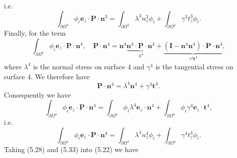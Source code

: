 \documentclass{article}
\begin{document}
i.e.
\begin{equation}
\int_{\partial \Omega^{3}} \phi_i \mathbf{e}_z \cdot \mathbf{P} \cdot \mathbf{n}^3 = \int_{\partial \Omega^{3}} \lambda^3 n_z^3 \phi_i + \int_{\partial \Omega^{3}} \gamma^3 t_z^3 \phi_i. \tag{5.33}
\end{equation}
Finally, for the term
\begin{equation}
\int_{\partial \Omega^{4}} \phi_i \mathbf{e}_z \cdot \mathbf{P} \cdot \mathbf{n}^4, \quad
\mathbf{P} \cdot \mathbf{n}^4 = \mathbf{n}^4 \underbrace{\mathbf{n}^4 \cdot \mathbf{P} \cdot \mathbf{n}^4}_{\lambda^4} + \underbrace{(\mathbf{I} - \mathbf{n}^4 \mathbf{n}^4) \cdot \mathbf{P} \cdot \mathbf{n}^4}_{\gamma^4 \mathbf{t}^4}, \tag{5.35}
\end{equation}
where $\lambda^4$ is the normal stress on surface 4 and $\gamma^4$ is the tangential stress on surface 4. We therefore have
\begin{equation}
\mathbf{P} \cdot \mathbf{n}^4 = \lambda^4 \mathbf{n}^4 + \gamma^4 \mathbf{t}^4. \tag{5.36}
\end{equation}
Consequently we have
\begin{equation}
\int_{\partial \Omega^{4}} \phi_i \mathbf{e}_z \cdot \mathbf{P} \cdot \mathbf{n}^4 = \int_{\partial \Omega^{4}} \phi_i \lambda^4 \mathbf{e}_z \cdot \mathbf{n}^4 + \int_{\partial \Omega^{4}} \phi_i \gamma^4 \mathbf{e}_z \cdot \mathbf{t}^4, \tag{5.37}
\end{equation}
i.e.
\begin{equation}
\int_{\partial \Omega^{4}} \phi_i \mathbf{e}_z \cdot \mathbf{P} \cdot \mathbf{n}^4 = \int_{\partial \Omega^{4}} \lambda^4 n_z^4 \phi_i + \int_{\partial \Omega^{4}} \gamma^4 t_z^4 \phi_i. \tag{5.38}
\end{equation}
Taking (5.28) and (5.33) into (5.22) we have
\end{document}
